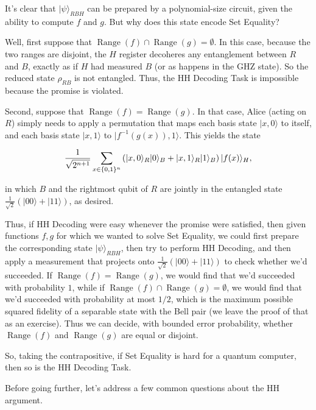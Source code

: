 \documentclass[12pt]{report}
\theoremstyle{plain}
\theoremstyle{definition}
\renewcommand{\ket}[1]{|#1\rangle}
\begin{document}
It's clear that $\ket{\psi}_{RBH}$ can be prepared by a polynomial-size circuit, given the ability to compute $f$ and $g$.  But why
does this state encode Set Equality?

Well, first suppose that $\operatorname*{Range}(f) \cap \operatorname*{Range}(g) = \emptyset$.
In this case, because the two ranges are disjoint, the $H$ register decoheres
any entanglement between $R$ and $B$, exactly as if $H$ had measured $B$ (or as happens in the GHZ state).
So the reduced state $\rho_{RB}$ is not entangled.  Thus, the HH Decoding Task is impossible because the promise is violated.

Second, suppose that $\operatorname*{Range}(f)=\operatorname*{Range}(g)$.
In that case, Alice (acting on $R$) simply needs to apply a permutation that maps each basis state $\ket{x,0}$ to itself,
and each basis state $\ket{x,1}$ to $\ket{f^{-1}(g(x)),1}$.  This yields the state

$${1 \over \sqrt{2^{n+1}}}
\sum_{x\in\{0,1\}^n} \left( \ket{x,0}_R \ket{0}_B + \ket{x,1}_R \ket{1}_B \right) \ket{f(x)}_H,
$$

\noindent in which $B$ and the rightmost qubit of $R$ are jointly in the entangled state $\frac{1}{\sqrt{2}}(\ket{00} + \ket{11})$, as desired.

Thus, if HH Decoding were easy whenever the promise were satisfied, then given functions $f,g$ for which we wanted to solve Set Equality,
we could first prepare the corresponding state $\ket{\psi}_{RBH}$, then try to perform HH Decoding, and then apply a measurement that projects
onto $\frac{1}{\sqrt{2}}(\ket{00} + \ket{11})$ to check whether we'd succeeded.  If $\operatorname*{Range}(f) = \operatorname*{Range}(g)$, we would find that we'd succeeded with probability $1$, while if $\operatorname*{Range}(f) \cap \operatorname*{Range}(g) = \emptyset$, we would find that we'd succeeded with probability at most $1/2$, which is the maximum possible squared fidelity of a separable state with the Bell pair (we leave the proof of that as an exercise).  Thus we can decide, with bounded error probability, whether $\operatorname*{Range}(f)$ and $\operatorname*{Range}(g)$ are equal or disjoint.

So, taking the contrapositive, if Set Equality is hard for a quantum computer, then so is the HH Decoding Task.

Before going further, let's address a few common questions about the HH argument.
\end{document}

